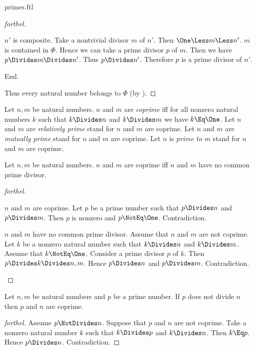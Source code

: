 \documentclass{stex}
\begin{document}
\begin{smodule}{primes.ftl}
\begin{proof}[forthel]
    \begin{case}{$n'$ is composite.}
      Take a nontrivial divisor $m$ of $n'$.
      Then $\One \Less m \Less n'$.
      $m$ is contained in $\Phi$.
      Hence we can take a prime divisor $p$ of $m$.
      Then we have $p \Divides m \Divides n'$.
      Thus $p \Divides n'$.
      Therefore $p$ is a prime divisor of $n'$.
    \end{case}
  End.

  Thus every natural number belongs to $\Phi$ (by ).
\end{proof}

\begin{definition*}[forthel,for={coprime,relatively prime,mutually prime}]
  Let $n, m$ be natural numbers.
  $n$ and $m$ are \emph{coprime} iff for all nonzero natural numbers $k$ such that $k \Divides n$ and $k \Divides m$ we have $k \Eq \One$.
  Let $n$ and $m$ are \emph{relatively prime} stand for $n$ and $m$ are coprime.
  Let $n$ and $m$ are \emph{mutually prime} stand for $n$ and $m$ are coprime.
  Let $n$ is \emph{prime to $m$} stand for $n$ and $m$ are coprime.
\end{definition*}

\begin{proposition*}[forthel]
  Let $n, m$ be natural numbers.
  $n$ and $m$ are coprime iff $n$ and $m$ have no common prime divisor.
\end{proposition*}
\begin{proof}[forthel]
  \begin{case}{$n$ and $m$ are coprime.}
    Let $p$ be a prime number such that $p \Divides n$ and $p \Divides m$.
    Then $p$ is nonzero and $p \NotEq \One$.
    Contradiction.
  \end{case}

  \begin{case}{$n$ and $m$ have no common prime divisor.}
    Assume that $n$ and $m$ are not coprime.
    Let $k$ be a nonzero natural number such that $k \Divides n$ and $k \Divides m$.
    Assume that $k \NotEq \One$.
    Consider a prime divisor $p$ of $k$.
    Then $p \Divides k \Divides n,m$.
    Hence $p \Divides n$ and $p \Divides m$.
    Contradiction.
  \end{case}
\end{proof}

\begin{proposition*}[forthel]
  Let $n, m$ be natural numbers and $p$ be a prime number.
  If $p$ does not divide $n$ then $p$ and $n$ are coprime.
\end{proposition*}
\begin{proof}[forthel]
  Assume $p \NotDivides n$.
  Suppose that $p$ and $n$ are not coprime.
  Take a nonzero natural number $k$ such that $k \Divides p$ and $k \Divides n$.
  Then $k \Eq p$.
  Hence $p \Divides n$.
  Contradiction.
\end{proof}


\end{smodule}
\end{document}
